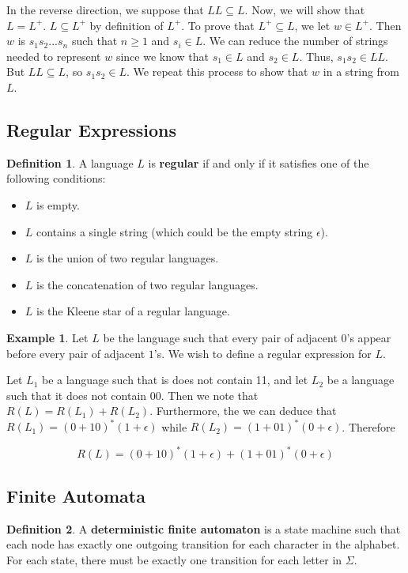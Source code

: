 \documentclass[11pt]{article}
\theoremstyle{plain} %
\theoremstyle{definition}
\newtheorem*{definition}{Definition} %
\theoremstyle{example}
\newtheorem*{example}{Example}
\theoremstyle{remark}
\begin{document}
In the reverse direction, we suppose that $LL \subseteq L$. Now, we will show that $L = L^+$. $L \subseteq L^+$ by definition of $L^+$. To prove that $L^+ \subseteq L$, we let $w \in L^+$. Then $w$ is $s_1s_2...s_n$ such that $n\geq 1$ and $s_i \in L$. We can reduce the number of strings needed to represent $w$ since we know that $s_1 \in L$ and $s_2 \in L$. Thus, $s_1s_2 \in LL$. But $LL\subseteq L$, so $s_1s_2 \in L$. We repeat this process to show that $w$ in a string from $L$. 


\subsection{Regular Expressions}

\begin{definition}
A language $L$ is \textbf{regular} if and only if it satisfies one of the following conditions:

	\begin{itemize}
		\item $L$ is empty.
		\item $L$ contains a single string (which could be the empty string $\epsilon$).
		\item $L$ is the union of two regular languages.
		\item $L$ is the concatenation of two regular languages.
		\item $L$ is the Kleene star of a regular language.
	\end{itemize}
\end{definition}

\begin{example}
	Let $L$ be the language such that every pair of adjacent $0$'s appear before every pair of adjacent $1$'s. We wish to define a regular expression for $L$.
\end{example}

Let $L_1$ be a language such that is does not contain 11, and let $L_2$ be a language such that it does not contain 00. Then we note that $R(L) = R(L_1)+ R(L_2)$. Furthermore, the we can deduce that $R(L_1) = (0+10)^*(1+\epsilon)$ while $R(L_2) = (1+01)^*(0+\epsilon)$. Therefore

$$R(L) = (0+10)^*(1+\epsilon)+(1+01)^*(0+\epsilon)$$

\subsection{Finite Automata}

\begin{definition}
A \textbf{deterministic finite automaton} is a state machine such that each node has exactly one outgoing transition for each character in the alphabet. For each state, there must be exactly one transition for each letter in $\Sigma$.\end{definition}
\end{document}
